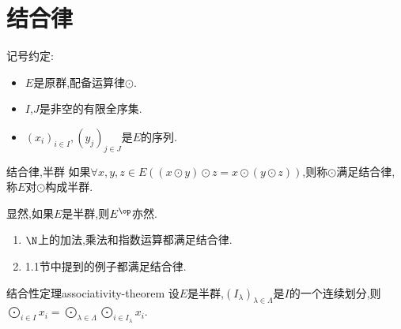 \section{结合律}

记号约定:
\begin{itemize}
	\item $E$是原群,配备运算律$\odot$.
	\item $I$,$J$是非空的有限全序集.
	\item $\left(x_{i}\right)_{i\in I},\left(y_{j}\right)_{j\in J}$是$E$的序列.
\end{itemize}

\begin{definition}{结合律,半群}{}
	如果$\forall x,y,z\in E\left(\left(x\odot y\right)\odot z=x\odot\left(y\odot z\right)\right)$,则称$\odot$满足结合律,称$E$对$\odot$构成半群.
\end{definition}

显然,如果$E$是半群,则$E^{\op}$亦然.

\begin{example}{}{}
	\begin{enumerate}
		\item $\N$上的加法,乘法和指数运算都满足结合律.
		\item 1.1节中提到的例子都满足结合律.
	\end{enumerate}
\end{example}

\begin{theorem}{结合性定理}{associativity-theorem}
	设$E$是半群,$\left(I_{\lambda}\right)_{\lambda\in\Lambda}$是$I$的一个连续划分,则$\bigodot\limits_{i\in I}x_{i}=\bigodot\limits_{\lambda\in\Lambda}\bigodot\limits_{i\in I_{\lambda}}x_{i}$.
\end{theorem}

